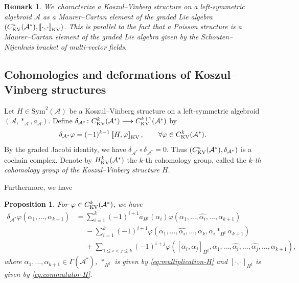 \documentclass[pdftex]{sigma}%
\numberwithin{equation}{section}
\newtheorem{pro}[thm]{Proposition}
\newtheorem{rmk}[thm]{Remark}
\newcommand{\huaA}{\mathcal{A}}
\newcommand{\Courant}[1]{\left[\!\left[ #1\right]\!\right]}
\newcommand{\Sym}{\mathrm{Sym}}
\begin{document}
\begin{rmk}
We~characterize a Koszul--Vinberg structure on a left-symmetric algebroid $\huaA$ as a Maurer--Cartan element of the graded Lie algebra $(C_{\rm KV}^{*}(\huaA^*),\Courant{\cdot,\cdot}_{\rm KV})$. This is parallel to the fact that a Poisson structure is a Maurer--Cartan element of the graded Lie algebra given by the Schouten--Nijenhuis bracket of multi-vector fields.
\end{rmk}

\subsection{Cohomologies and deformations of Koszul--Vinberg structures}


Let $H\in \Sym^2(\huaA)$ be a Koszul--Vinberg structure on a left-symmetric algebroid $(\huaA,\ast_\huaA,a_\huaA)$. Define $\delta_{\huaA^*}\colon C_{\rm KV}^{k}(\huaA^*)\longrightarrow
C_{\rm KV}^{k+1}(\huaA^*)$ by
\begin{gather*}
\delta_{\huaA^*}\varphi =(-1)^{k-1}\Courant{H,\varphi}_{\rm KV},\qquad
\forall \varphi\in C_{\rm KV}^{k}(\huaA^*).
\end{gather*}
By the graded Jacobi identity, we have $\delta_{\huaA^*}\circ \delta_{\huaA^*}=0$. Thus $(C_{\rm KV}^{*}(\huaA^*),\delta_{\huaA^*})$ is a cochain comp\-lex. Denote by $H_{\rm KV}^k(\huaA^*)$ the $k$-th cohomology group, called the {\it $k$-th cohomology group of the Koszul--Vinberg structure $H$}.

Furthermore, we have
\begin{pro}
For $\varphi\in C_{\rm KV}^{k}(\huaA^*)$, we have
 \begin{align*}%
\delta_{\huaA^*}\varphi(\alpha_1,\dots,\alpha_{k+1})
 &=\sum_{i=1}^{k}(-1)^{i+1}a_{H^\sharp} (\alpha_i)\varphi(\alpha_1,\dots,\hat{\alpha_i},\dots,\alpha_{k+1})
 \\
 &\phantom{=}-\sum_{i=1}^{k}(-1)^{i+1}\varphi (\alpha_1,\dots,\hat{\alpha_i},\dots,\alpha_k,\alpha_i\ast_{H^\sharp} \alpha_{k+1})
 \\
 &\phantom{=}+\sum_{1\leq i<j\leq k}(-1)^{i+j}\varphi([\alpha_i,\alpha_j]_{H^\sharp},\alpha_1, \dots,\hat{\alpha_i},\dots,\hat{\alpha_j},\dots,\alpha_{k+1}),
\end{align*}
where $\alpha_1,\dots,\alpha_{k+1}\in\Gamma(\huaA^*)$, $\ast_{H^\sharp}$ is given by \eqref{eq:multiplication-H} and $[\cdot,\cdot]_{H^\sharp}$ is given by \eqref{eq:commutator-H}.
\end{pro}
\end{document}
